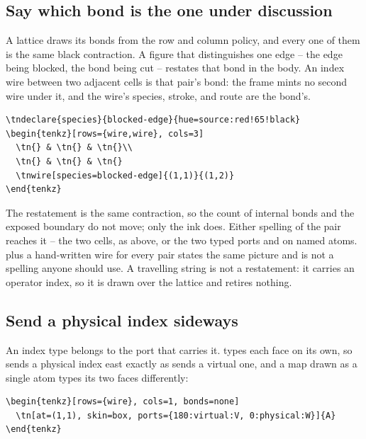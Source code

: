 \subsection{Say which bond is the one under discussion}

A lattice draws its bonds from the row and column policy, and every one of
them is the same black contraction.  A figure that distinguishes one edge --
the edge being blocked, the bond being cut -- restates that bond in the body.
An index wire between two adjacent cells is that pair's bond: the frame mints
no second wire under it, and the wire's species, stroke, and route are the
bond's.

\begin{Verbatim}[fontsize=\small,frame=leftline]
\tndeclare{species}{blocked-edge}{hue=source:red!65!black}
\begin{tenkz}[rows={wire,wire}, cols=3]
  \tn{} & \tn{} & \tn{}\\
  \tn{} & \tn{} & \tn{}
  \tnwire[species=blocked-edge]{(1,1)}{(1,2)}
\end{tenkz}
\end{Verbatim}

The restatement is the same contraction, so the count of internal bonds and
the exposed boundary do not move; only the ink does.  Either spelling of the
pair reaches it -- the two cells, as above, or the two typed ports
 and  on named atoms.   plus a
hand-written wire for every pair states the same picture and is not a
spelling anyone should use.  A travelling string is not a restatement: it
carries an operator index, so it is drawn over the lattice and retires
nothing.

\subsection{Send a physical index sideways}

An index type belongs to the port that carries it.   types each
face on its own, so  sends a physical index east exactly as
 sends a virtual one, and a map drawn as a single atom types
its two faces differently:

\begin{Verbatim}[fontsize=\small,frame=leftline]
\begin{tenkz}[rows={wire}, cols=1, bonds=none]
  \tn[at=(1,1), skin=box, ports={180:virtual:V, 0:physical:W}]{A}
\end{tenkz}
\end{Verbatim}

